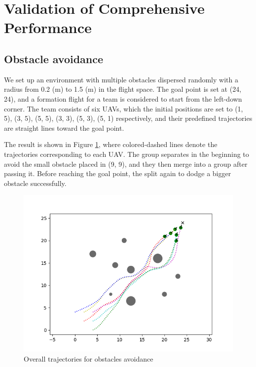 \section{Validation of Comprehensive Performance}
\subsection{Obstacle avoidance}
We set up an environment with multiple obstacles dispersed randomly with a radius from 0.2 (m) to 1.5 (m) in the flight space. The goal point is set at (24, 24), and a formation flight for a team is considered to start from the left-down corner. The team consists of six UAVs, which the initial positions are set to (1, 5), (3, 5), (5, 5), (3, 3), (5, 3), (5, 1) respectively, and their predefined trajectories are straight lines toward the goal point.

The result is shown in Figure \ref{fig:trajectory}, where colored-dashed lines denote the trajectories corresponding to each UAV. The group separates in the beginning to avoid the small obstacle placed in (9, 9), and they then merge into a group after passing it. Before reaching the goal point, the split again to dodge a bigger obstacle successfully.

\begin{figure}[H]
    \centering
    \includegraphics[scale=0.7]{figures/exp1-3.png}
    \caption{Overall trajectories for obstacles avoidance}
    \label{fig:trajectory}
\end{figure}

